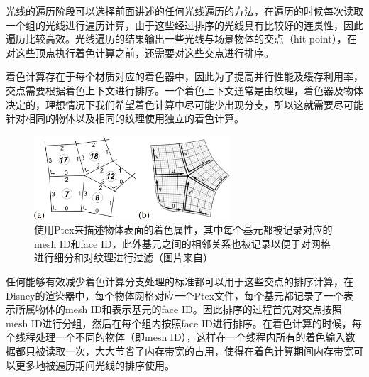 光线的遍历阶段可以选择前面讲述的任何光线遍历的方法，在遍历的时候每次读取一个组的光线进行遍历计算，由于这些经过排序的光线具有比较好的连贯性，因此遍历比较高效。光线遍历的结果输出一些光线与场景物体的交点（hit point），在对这些顶点执行着色计算之前，还需要对这些交点进行排序。

着色计算存在于每个材质对应的着色器中，因此为了提高并行性能及缓存利用率，交点需要根据着色上下文进行排序。一个着色上下文通常是由纹理，着色器及物体决定的，理想情况下我们希望着色计算中尽可能少出现分支，所以这就需要尽可能针对相同的物体以及相同的纹理使用独立的着色计算。

\begin{figure}
	\sidecaption
	\includegraphics[width=0.65\textwidth]{figures/pt/path-12}
	\caption{使用Ptex来描述物体表面的着色属性，其中每个基元都被记录对应的mesh ID和face ID，此外基元之间的相邻关系也被记录以便于对网格进行细分和对纹理进行过滤（图片来自\cite{a:SortedDeferredShadingforProductionPathTracing}）}
	\label{f:ptex}
\end{figure}

任何能够有效减少着色计算分支处理的标准都可以用于这些交点的排序计算，在Disney的渲染器中，每个物体网格对应一个Ptex文件\cite{a:Ptex:PerFaceTextureMappingforProductionRendering}，每个基元都记录了一个表示所属物体的mesh ID和表示基元的face ID。因此排序的过程首先对交点按照mesh ID进行分组，然后在每个组内按照face ID进行排序。在着色计算的时候，每个线程处理一个不同的物体（即mesh ID），这样在一个线程内所有的着色输入数据都只被读取一次，大大节省了内存带宽的占用，使得在着色计算期间内存带宽可以更多地被遍历期间光线的排序使用。

